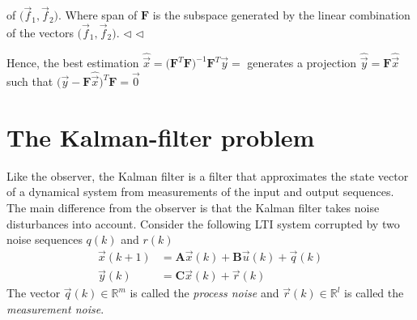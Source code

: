 \documentclass[12pt,a4paper,oneside]{book}
\begin{document}
\begin{onehalfspace}
\begin{example}
	of $\big(\vec{f}_1,\vec{f}_2\big)$. Where span of $\mathbf{F}$ is the 
	subspace generated by the linear combination of the vectors 
	$\big(\vec{f}_1,\vec{f}_2\big)$.
	$\triangleleft$
$\triangleleft$ 
\end{example}
Hence, the best estimation 
$\hat{\vec{x}}=\Big(\mathbf{F}^T\mathbf{F}\Big)^{-1}\mathbf{F}^T\vec{y}=$ 
generates a projection $\hat{\vec{y}}=\mathbf{F}\hat{\vec{x}}$ such that 
$\Big(\vec{y}-\mathbf{F}\hat{\vec{x}}\Big)^T\mathbf{F}=\vec{0}$

\section{The Kalman-filter problem}
Like the observer, the Kalman filter is a filter that approximates the state 
vector of a dynamical system from measurements of the input and output 
sequences. The main difference from the observer is that the Kalman filter 
takes noise disturbances into account. Consider the following LTI system 
corrupted by two noise sequences $q(k)$ and $r(k)$
\begin{equation}\label{kfp_1}
	\begin{aligned}
		\vec{x}(k+1) &= \mathbf{A}\vec{x}(k)+\mathbf{B}\vec{u}(k) + 
		\vec{q}(k)\\[6pt]
		\vec{y}(k) &= \mathbf{C}\vec{x}(k) + \vec{r}(k)
	\end{aligned}
\end{equation}
The vector $\vec{q}(k)\in\mathbb{R}^m$ is called the \textit{process noise} and 
$\vec{r}(k)\in\mathbb{R}^l$ is called the \textit{measurement noise}.\\


\end{onehalfspace}
\end{document}
